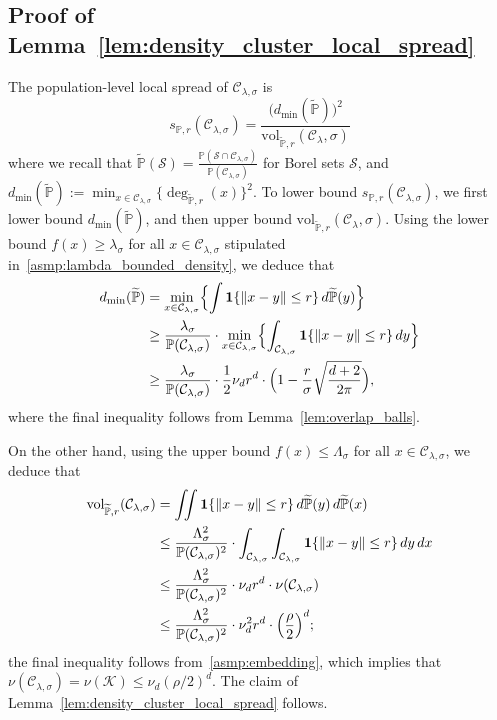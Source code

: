 \documentclass{article}
\newcommand{\vol}{\mathrm{vol}}
\newcommand{\1}{\mathbf{1}}
\newcommand{\mc}[1]{\mathcal{#1}}
\newcommand{\Pbb}{\mathbb{P}}
\newcommand{\wt}[1]{\widetilde{#1}}
\theoremstyle{definition}
\theoremstyle{remark}
\begin{document}
\subsection{Proof of Lemma~\ref{lem:density_cluster_local_spread}}
\label{subsec:density_cluster_local_spread}
The population-level local spread of $\mc{C}_{\lambda,\sigma}$ is
\begin{equation*}
s_{\Pbb,r}(\mc{C}_{\lambda,\sigma}) = \frac{\bigl(d_{\min}(\wt{\Pbb})\bigr)^2}{\vol_{\wt{\Pbb},r}(\mc{C}_{\lambda},\sigma)}
\end{equation*}
where we recall that $\wt{\Pbb}(\mc{S}) = \frac{\Pbb(\mc{S} \cap \mc{C}_{\lambda,\sigma})}{\Pbb(\mc{C}_{\lambda,\sigma})}$ for Borel sets $\mc{S}$, and $d_{\min}(\wt{\Pbb}) := \min_{x \in \mc{C}_{\lambda,\sigma}}\{\deg_{\wt{\Pbb},r}(x)\}^2$. To lower bound $s_{\Pbb,r}(\mc{C}_{\lambda,\sigma})$, we first lower bound $d_{\min}(\wt{\Pbb})$, and then upper bound $\vol_{\wt{\Pbb},r}(\mc{C}_{\lambda},\sigma)$. Using the lower bound $f(x) \geq \lambda_{\sigma}$ for all $x \in \mc{C}_{\lambda,\sigma}$ stipulated in~\ref{asmp:lambda_bounded_density}, we deduce that
\begin{align*}
d_{\min}(\wt{\Pbb}) & = \min_{x \in \mc{C}_{\lambda,\sigma}} \Bigl\{ \int \1\{\|x - y\| \leq r\} \,d\wt{\Pbb}(y) \Bigr\} \\
& \geq \frac{\lambda_{\sigma}}{\Pbb(\mc{C}_{\lambda,\sigma})} \cdot \min_{x \in \mc{C}_{\lambda,\sigma}} \Bigl\{ \int_{\mc{C}_{\lambda,\sigma}} \1\{\|x - y\| \leq r\} \,dy \Bigr\} \\
& \geq \frac{\lambda_{\sigma}}{\Pbb(\mc{C}_{\lambda,\sigma})} \cdot \frac{1}{2}\nu_dr^d \cdot \Bigl(1 - \frac{r}{\sigma} \sqrt{\frac{d + 2}{2\pi}}\Bigr),
\end{align*}
where the final inequality follows from Lemma~\ref{lem:overlap_balls}. 

On the other hand, using the upper bound $f(x) \leq \Lambda_{\sigma}$ for all $x \in \mc{C}_{\lambda,\sigma}$, we deduce that
\begin{align*}
\vol_{\wt{\Pbb},r}(\mc{C}_{\lambda,\sigma}) & = \iint \1\{\|x - y\|\leq r\} \,d\wt{\Pbb}(y) \,d\wt{\Pbb}(x) \\
& \leq \frac{\Lambda_{\sigma}^2}{\Pbb(\mc{C}_{\lambda,\sigma})^2} \cdot \int_{\mc{C}_{\lambda,\sigma}} \int_{\mc{C}_{\lambda,\sigma}} \1\{\|x - y\|\leq r\} \,dy \,dx \\
& \leq \frac{\Lambda_{\sigma}^2}{\Pbb(\mc{C}_{\lambda,\sigma})^2} \cdot \nu_d r^d \cdot \nu(\mc{C}_{\lambda,\sigma}) \\
& \leq \frac{\Lambda_{\sigma}^2}{\Pbb(\mc{C}_{\lambda,\sigma})^2} \cdot \nu_d^2 r^d  \cdot \Bigl(\frac{\rho}{2}\Bigr)^d;
\end{align*}
the final inequality follows from~\ref{asmp:embedding}, which implies that $\nu(\mc{C}_{\lambda,\sigma}) = \nu(\mc{K}) \leq \nu_d(\rho/2)^d$. The claim of Lemma~\ref{lem:density_cluster_local_spread} follows.
\end{document}
